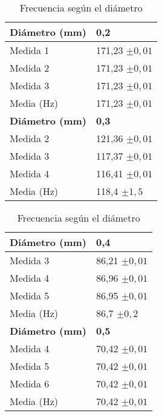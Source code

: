 \documentclass[a4paper,12pt,spanish]{article}
\begin{document}
\begin{table}[H]
	\begin{minipage}[t]{.48\linewidth}
		\centering
		\begin{tabular}{|l|l|}
			\hline
			\textbf{Diámetro (mm)} & \textbf{0,2}    \\ \hline
			Medida 1              & 171,23 $\pm 0,01$        \\ \hline
			Medida 2              & 171,23   $\pm 0,01$      \\ \hline
			Medida 3              & 171,23 $\pm 0,01$        \\ \hline
			Media (Hz)             & 171,23  $\pm 0,01$       \\ \hline\hline
			\textbf{Diámetro (mm)} & \textbf{0,3}    \\ \hline
			Medida 2              & 121,36  $\pm 0,01$       \\ \hline
			Medida 3              & 117,37 $\pm 0,01$        \\ \hline
			Medida 4              & 116,41 $\pm 0,01$        \\ \hline
			Media (Hz)             & 118,4  $\pm 1,5$       \\ \hline
		\end{tabular}
		
	\end{minipage}\hfill
	\mbox{}
	\begin{minipage}[t]{.48\linewidth}%
		\centering
		\begin{tabular}{|l|l|}
			\hline
			\textbf{Diámetro (mm)} & \textbf{0,4}    \\ \hline
			Medida 3              & 86,21 $\pm 0,01$         \\ \hline
			Medida 4              & 86,96 $\pm 0,01$         \\ \hline
			Medida 5              & 86,95  $\pm 0,01$        \\ \hline
			Media (Hz)             & 86,7   $\pm 0,2$       \\ \hline\hline
			\textbf{Diámetro (mm)} & \textbf{0,5}    \\ \hline
			Medida 4              & 70,42 $\pm 0,01$        \\ \hline
			Medida 5              & 70,42 $\pm 0,01$         \\ \hline
			Medida 6              & 70,42 $\pm 0,01$         \\ \hline
			Media (Hz)             & 70,42   $\pm 0,01$       \\ \hline
		\end{tabular}
		
	\end{minipage}\hfill
	\mbox{}
	\caption{Frecuencia según el diámetro}
\end{table}
\end{document}
